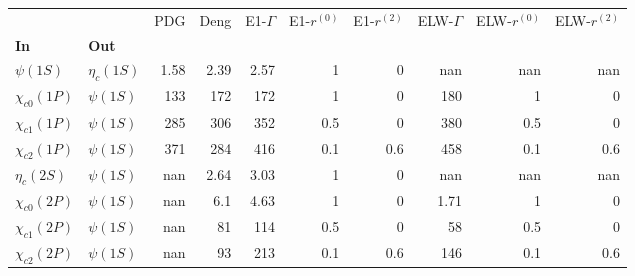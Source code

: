 \begin{tabular}{l|l|r|r|r|r|r|r|r|r}
\toprule
                &            &  PDG &  Deng &  E1-$\Gamma$ &  E1-$r^{(0)}$ &  E1-$r^{(2)}$ &  ELW-$\Gamma$ &  ELW-$r^{(0)}$ &  ELW-$r^{(2)}$ \\
\textbf{In} & \textbf{Out} &      &       &              &               &               &               &                &                \\
\midrule
\textbf{$\psi(1S)$} & \textbf{$\eta_{c}(1S)$} & 1.58 &  2.39 &         2.57 &             1 &             0 &           nan &            nan &            nan \\
\textbf{$\chi_{c0}(1P)$} & \textbf{$\psi(1S)$} &  133 &   172 &          172 &             1 &             0 &           180 &              1 &              0 \\
\textbf{$\chi_{c1}(1P)$} & \textbf{$\psi(1S)$} &  285 &   306 &          352 &           0.5 &             0 &           380 &            0.5 &              0 \\
\textbf{$\chi_{c2}(1P)$} & \textbf{$\psi(1S)$} &  371 &   284 &          416 &           0.1 &           0.6 &           458 &            0.1 &            0.6 \\
\textbf{$\eta_{c}(2S)$} & \textbf{$\psi(1S)$} &  nan &  2.64 &         3.03 &             1 &             0 &           nan &            nan &            nan \\
\textbf{$\chi_{c0}(2P)$} & \textbf{$\psi(1S)$} &  nan &   6.1 &         4.63 &             1 &             0 &          1.71 &              1 &              0 \\
\textbf{$\chi_{c1}(2P)$} & \textbf{$\psi(1S)$} &  nan &    81 &          114 &           0.5 &             0 &            58 &            0.5 &              0 \\
\textbf{$\chi_{c2}(2P)$} & \textbf{$\psi(1S)$} &  nan &    93 &          213 &           0.1 &           0.6 &           146 &            0.1 &            0.6 \\
\bottomrule
\end{tabular}
